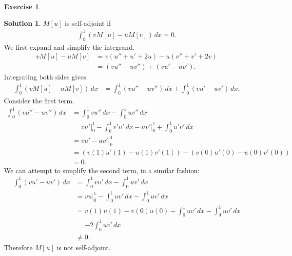 \documentclass{book}
\theoremstyle{definition}
\newtheorem*{exer*}{Exercise}
\newtheorem*{sln*}{Solution}
\begin{document}
\begin{exer*}
\begin{enumerate}
		\begin{sln*}
			$M[u]$ is self-adjoint if
			\begin{align*}
			\int^1_0 (vM[u] - uM[v])\,dx = 0.
			\end{align*}
			We first expand and simplify the integrand.
			\begin{align*}
			vM[u] - uM[v] &= v( u''+ u' + 2u) - u( v''+ v' + 2v)\\
			&= (vu'' - uv'') + (vu' - uv').
			\end{align*}
			Integrating both sides gives
			\begin{align*}
			\int^1_0 (vM[u] - uM[v])\,dx &= \int^1_0 (vu'' - uv'')\,dx + \int^1_0 (vu' - uv')\,dx.
			\end{align*} 
			Consider the first term.
			\begin{align*}
			\int^1_0 (vu'' - uv'')\,dx &= \int^1_0 vu''\,dx - \int^1_0 uv''\,dx\\
			&= vu'\bigg\vert^1_0 - \int^1_0 v'u'\,dx - uv'\bigg\vert^1_0 +  \int^1_0 u'v'\,dx\\
			&= vu' - uv' \bigg\vert^1_0\\
			&= (v(1)u'(1) - u(1)v'(1)) - (v(0)u'(0) - u(0)v'(0))\\
			&= 0. 
			\end{align*}
			We can attempt to simplify the second term, in a similar fashion:
			\begin{align*}
			\int^1_0 (vu' - uv')\,dx &= \int^1_0 vu'\,dx - \int^1_0   uv'\,dx\\
			&= vu\bigg\vert^1_0 - \int^1_0   uv'\,dx - \int^1_0   uv'\,dx\\
			&= v(1)u(1) - v(0)u(0) - \int^1_0   uv'\,dx - \int^1_0   uv'\,dx\\
			&= -2\int^1_0   uv'\,dx\\
			&\neq 0.
			\end{align*} 
			Therefore $M[u]$ is not self-adjoint. 
		\end{sln*}
		\newpage
		
		
		
		
		

\end{enumerate}
\end{exer*}
\end{document}
